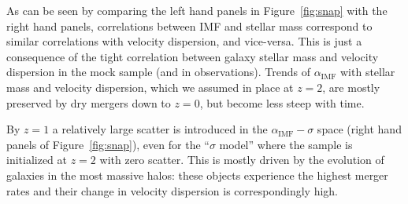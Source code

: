 \documentclass[usenatbib, letters]{mnras}
\def\aimf{\alpha_{\mathrm{IMF}}}
\def\Fref#1{Figure~\ref{#1}\xspace}
\begin{document}
As can be seen by comparing the left hand panels in \Fref{fig:snap} with the right hand panels, correlations between IMF and stellar mass correspond to similar correlations with velocity dispersion, and vice-versa. This is just a consequence of the tight correlation between galaxy stellar mass and velocity dispersion in the mock sample (and in observations). 
Trends of $\aimf$ with stellar mass and velocity dispersion, which we assumed in place at $z=2$, are mostly preserved by dry mergers down to $z=0$, but become less steep with time.

By $z=1$ a relatively large scatter is introduced in the $\aimf-\sigma$ space (right hand panels of \Fref{fig:snap}), even for the ``$\sigma$ model'' where the sample is initialized at $z=2$ with zero scatter. This is mostly driven by the evolution of galaxies in the most massive halos: these objects experience the highest merger rates and their change in velocity dispersion is correspondingly high. %
\end{document}
